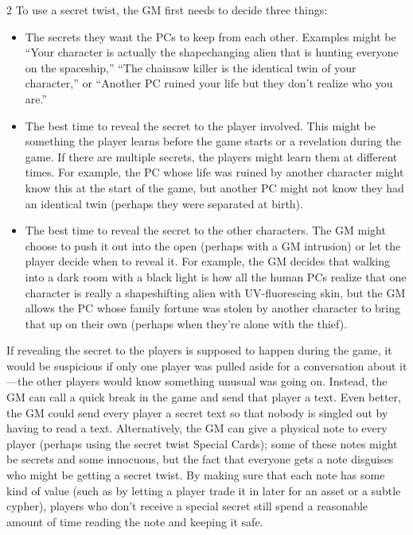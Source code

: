 \begin{multicols}{2}
To use a secret twist, the GM first needs to decide three things:

\begin{itemize}
\item The secrets they want the PCs to keep from each other. Examples might be “Your character is actually the shapechanging alien that is hunting everyone on the spaceship,” “The chainsaw killer is the identical twin of your character,” or “Another PC ruined your life but they don’t realize who you are.”
\item The best time to reveal the secret to the player involved. This might be something the player learns before the game starts or a revelation during the game. If there are multiple secrets, the players might learn them at different times. For example, the PC whose life was ruined by another character might know this at the start of the game, but another PC might not know they had an identical twin (perhaps they were separated at birth).
\item The best time to reveal the secret to the other characters. The GM might choose to push it out into the open (perhaps with a GM intrusion) or let the player decide when to reveal it. For example, the GM decides that walking into a dark room with a black light is how all the human PCs realize that one character is really a shapeshifting alien with UV-fluorescing skin, but the GM allows the PC whose family fortune was stolen by another character to bring that up on their own (perhaps when they’re alone with the thief).
\end{itemize}

If revealing the secret to the players is supposed to happen during the game, it would be suspicious if only one player was pulled aside for a conversation about it—the other players would know something unusual was going on. Instead, the GM can call a quick break in the game and send that player a text. Even better, the GM could send every player a secret text so that nobody is singled out by having to read a text. Alternatively, the GM can give a physical note to every player (perhaps using the secret twist Special Cards); some of these notes might be secrets and some innocuous, but the fact that everyone gets a note disguises who might be getting a secret twist. By making sure that each note has some kind of value (such as by letting a player trade it in later for an asset or a subtle cypher), players who don’t receive a special secret still spend a reasonable amount of time reading the note and keeping it safe.


\end{multicols}
